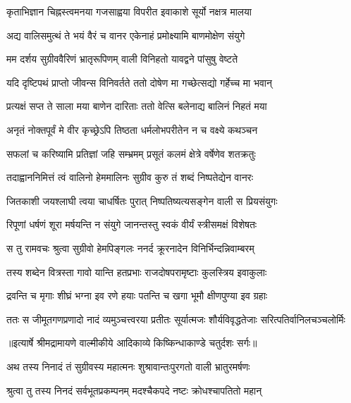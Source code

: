 \twolineshloka
{कृताभिज्ञान चिह्नस्त्वमनया गजसाह्वया}
{विपरीत इवाकाशे सूर्यो नक्षत्र मालया} %

\twolineshloka
{अद्य वालिसमुत्थं ते भयं वैरं च वानर}
{एकेनाहं प्रमोक्ष्यामि बाणमोक्षेण संयुगे} %

\twolineshloka
{मम दर्शय सुग्रीववैरिणं भ्रातृरूपिणम्}
{वाली विनिहतो यावद्वने पांसुषु वेष्टते} %

\twolineshloka
{यदि दृष्टिपथं प्राप्तो जीवन्स विनिवर्तते}
{ततो दोषेण मा गच्छेत्सद्यो गर्हेच्च मा भवान्} %

\twolineshloka
{प्रत्यक्षं सप्त ते साला मया बाणेन दारिताः}
{ततो वेत्सि बलेनाद्य बालिनं निहतं मया} %

\twolineshloka
{अनृतं नोक्तपूर्वं मे वीर कृच्छ्रेऽपि तिष्ठता}
{धर्मलोभपरीतेन न च वक्ष्ये कथञ्चन} %

\twolineshloka
{सफलां च करिष्यामि प्रतिज्ञां जहि सम्भ्रमम्}
{प्रसूतं कलमं क्षेत्रे वर्षेणेव शतक्रतुः} %

\twolineshloka
{तदाह्वाननिमित्तं त्वं वालिनो हेममालिनः}
{सुग्रीव कुरु तं शब्दं निष्पतेद्येन वानरः} %

\twolineshloka
{जितकाशी जयश्लाघी त्वया चाधर्षितः पुरात्}
{निष्पतिष्यत्यसङ्गेन वाली स प्रियसंयुगः} %

\twolineshloka
{रिपूणां धर्षणं शूरा मर्षयन्ति न संयुगे}
{जानन्तस्तु स्वकं वीर्यं स्त्रीसमक्षं विशेषतः} %

\twolineshloka
{स तु रामवचः श्रुत्वा सुग्रीवो हेमपिङ्गलः}
{ननर्द क्रूरनादेन विनिर्भिन्दन्निवाम्बरम्} %

\twolineshloka
{तस्य शब्देन वित्रस्ता गावो यान्ति हतप्रभाः}
{राजदोषपरामृष्टाः कुलस्त्रिय इवाकुलाः} %

\twolineshloka
{द्रवन्ति च मृगाः शीघ्रं भग्ना इव रणे हयाः}
{पतन्ति च खगा भूमौ क्षीणपुण्या इव ग्रहाः} %

\fourlineindentedshloka
{ततः स जीमूतगणप्रणादो}
{नादं व्यमुञ्चत्त्वरया प्रतीतः}
{सूर्यात्मजः शौर्यविवृद्धतेजाः}
{सरित्पतिर्वानिलचञ्चलोर्मिः} %


{॥इत्यार्षे श्रीमद्रामायणे वाल्मीकीये आदिकाव्ये किष्किन्धाकाण्डे चतुर्दशः सर्गः॥}


\twolineshloka
{अथ तस्य निनादं तं सुग्रीवस्य महात्मनः}
{शुश्रावान्तःपुरगतो वाली भ्रातुरमर्षणः} %

\twolineshloka
{श्रुत्वा तु तस्य निनदं सर्वभूतप्रकम्पनम्}
{मदश्चैकपदे नष्टः क्रोधश्चापतितो महान्} %

